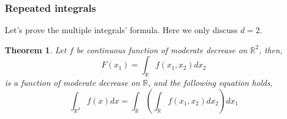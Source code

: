 \documentclass[a4paper]{article}
\newtheorem{theorem}{Theorem}[subsection]
\numberwithin{equation}{subsection}
\begin{document}
\subsubsection{Repeated integrals}
\par Let's prove the multiple integrals' formula. Here we only discuss $d=2$.
\begin{theorem}
    Let $f$ be continuous function of moderate decrease on $\mathbb{R}^2$, then,
    \begin{equation}
        F(x_1) = \int_{\mathbb{R}} f(x_1, x_2) dx_2
    \end{equation}
    is a function of moderate decrease on $\mathbb{R}$, and the following equation holds,
    \begin{equation}
        \int_{\mathbb{R}^2} f(x)dx = \int_{\mathbb{R}} (\int_{\mathbb{R}} f(x_1, x_2) dx_2) dx_1
    \end{equation}
\end{theorem}
\end{document}

